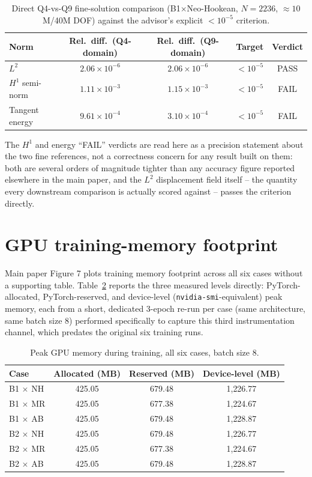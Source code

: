 \documentclass[11pt]{article}
\begin{document}
\begin{table}[h]
\centering
\caption{Direct Q4-vs-Q9 fine-solution comparison (B1$\times$Neo-Hookean,
  $N{=}2236$, $\approx10$M/40M DOF) against the advisor's explicit
  $<10^{-5}$ criterion.}
\label{tab:s9}
\small
\begin{tabular}{lcccc}
\toprule
Norm & Rel.\ diff.\ (Q4-domain) & Rel.\ diff.\ (Q9-domain) & Target & Verdict \\
\midrule
$L^2$            & $2.06\times10^{-6}$ & $2.06\times10^{-6}$ & $<10^{-5}$ & PASS \\
$H^1$ semi-norm  & $1.11\times10^{-3}$ & $1.15\times10^{-3}$ & $<10^{-5}$ & FAIL \\
Tangent energy   & $9.61\times10^{-4}$ & $3.10\times10^{-4}$ & $<10^{-5}$ & FAIL \\
\bottomrule
\end{tabular}
\end{table}

The $H^1$ and energy ``FAIL'' verdicts are read here as a precision
statement about the two fine references, not a correctness concern for
any result built on them: both are several orders of magnitude tighter
than any accuracy figure reported elsewhere in the main paper, and the
$L^2$ displacement field itself -- the quantity every downstream
comparison is actually scored against -- passes the criterion directly.

\FloatBarrier
\section{GPU training-memory footprint}
\label{sec:s10}
Main paper Figure 7 plots training memory footprint across all six
cases without a supporting table. Table~\ref{tab:s10} reports the three
measured levels directly: PyTorch-allocated, PyTorch-reserved, and
device-level (\texttt{nvidia-smi}-equivalent) peak memory, each from a
short, dedicated 3-epoch re-run per case (same architecture, same batch
size 8) performed specifically to capture this third instrumentation
channel, which predates the original six training runs.

\begin{table}[h]
\centering
\caption{Peak GPU memory during training, all six cases, batch size 8.}
\label{tab:s10}
\small
\begin{tabular}{lccc}
\toprule
Case & Allocated (MB) & Reserved (MB) & Device-level (MB) \\
\midrule
B1 $\times$ NH & 425.05 & 679.48 & 1{,}226.77 \\
B1 $\times$ MR & 425.05 & 677.38 & 1{,}224.67 \\
B1 $\times$ AB & 425.05 & 679.48 & 1{,}228.87 \\
B2 $\times$ NH & 425.05 & 679.48 & 1{,}226.77 \\
B2 $\times$ MR & 425.05 & 677.38 & 1{,}224.67 \\
B2 $\times$ AB & 425.05 & 679.48 & 1{,}228.87 \\
\bottomrule
\end{tabular}
\end{table}
\end{document}
